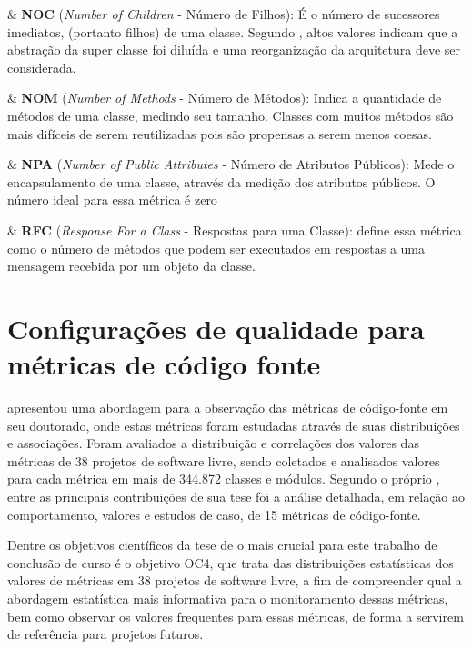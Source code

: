 \begin{easylist}
	& \textbf{NOC} (\textit{Number of Children} - Número de Filhos): É o número de sucessores imediatos,  (portanto filhos) de uma classe. Segundo , altos valores indicam que a abstração da super classe foi diluída e uma reorganização da arquitetura deve ser considerada.
	
	& \textbf{NOM} (\textit{Number of Methods} - Número de Métodos): Indica a quantidade de métodos de uma classe, medindo seu tamanho. Classes com muitos métodos são mais difíceis de serem reutilizadas pois são propensas a serem menos coesas. \cite{Meirelles2013}  

	& \textbf{NPA} (\textit{Number of Public Attributes} - Número de Atributos Públicos): Mede o encapsulamento de uma classe, através da medição dos atributos públicos. O número ideal para essa métrica é zero \cite{Meirelles2013}

	& \textbf{RFC} (\textit{Response For a Class} - Respostas para uma Classe):  define essa métrica como o número de métodos que podem ser executados em respostas a uma mensagem recebida por um objeto da classe.

\end{easylist}	


\section{Configurações de qualidade para métricas de código fonte} 

 apresentou uma abordagem para a observação das métricas de código-fonte em seu doutorado, onde estas métricas foram estudadas através de suas distribuições e associações. Foram avaliados a distribuição e correlações dos valores das métricas de 38 projetos de software livre, sendo coletados e analisados valores para cada métrica em mais de 344.872 classes e módulos. Segundo o próprio , entre as principais contribuições de sua tese foi a análise detalhada, em relação ao comportamento, valores e estudos de caso, de 15 métricas de código-fonte. 

Dentre os objetivos científicos da tese de  o mais crucial para este trabalho de conclusão de curso é o objetivo OC4, que trata das distribuições estatísticas dos valores de métricas em 38 projetos de software livre, a fim de compreender qual a abordagem estatística mais informativa para o monitoramento dessas métricas, bem como observar os valores frequentes para essas métricas, de forma a servirem de referência para projetos futuros.

